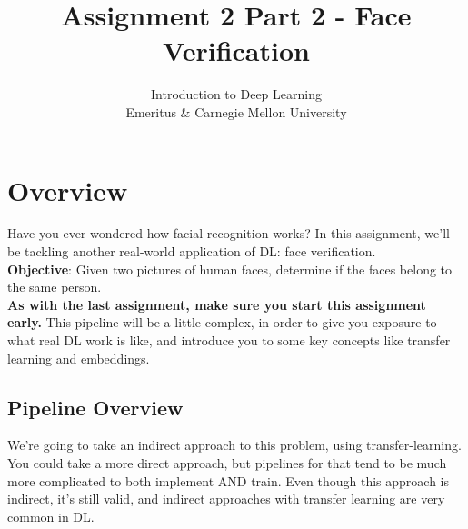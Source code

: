 \documentclass{article}
\title{Assignment 2 Part 2 - Face Verification}
\author{Introduction to Deep Learning \\ Emeritus \& Carnegie Mellon University}
\date{} \\
\begin{document}

\maketitle

\section{Overview}
Have you ever wondered how facial recognition works? In this assignment, we'll be tackling another real-world application of DL: face verification.\\

\textbf{Objective}: Given two pictures of human faces, determine if the faces belong to the same person.\\

\textbf{As with the last assignment, make sure you start this assignment early.} This pipeline will be a little complex, in order to give you exposure to what real DL work is like, and introduce you to some key concepts like transfer learning and embeddings. 


\subsection{Pipeline Overview}

We're going to take an indirect approach to this problem, using transfer-learning. You could take a more direct approach, but pipelines for that tend to be much more complicated to both implement AND train. Even though this approach is indirect, it's still valid, and indirect approaches with transfer learning are very common in DL.
\end{document}
